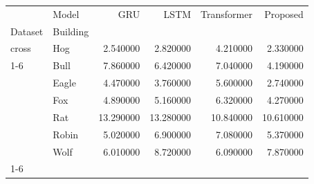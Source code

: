 \begin{tabular}{llrrrr}
\toprule
 & Model & GRU & LSTM & Transformer & Proposed \\
Dataset & Building &  &  &  &  \\
\midrule
cross & Hog & 2.540000 & 2.820000 & 4.210000 & 2.330000 \\
\cline{1-6}
\multirow[t]{6}{*}{holdout} & Bull & 7.860000 & 6.420000 & 7.040000 & 4.190000 \\
 & Eagle & 4.470000 & 3.760000 & 5.600000 & 2.740000 \\
 & Fox & 4.890000 & 5.160000 & 6.320000 & 4.270000 \\
 & Rat & 13.290000 & 13.280000 & 10.840000 & 10.610000 \\
 & Robin & 5.020000 & 6.900000 & 7.080000 & 5.370000 \\
 & Wolf & 6.010000 & 8.720000 & 6.090000 & 7.870000 \\
\cline{1-6}
\bottomrule
\end{tabular}
